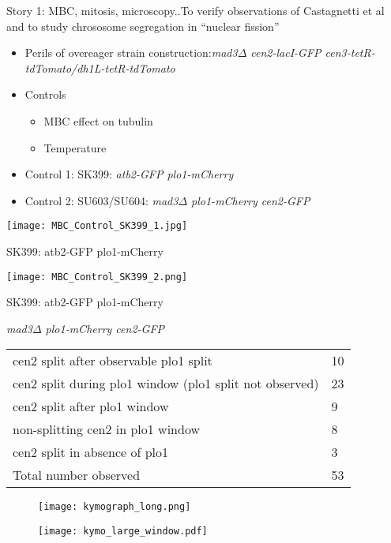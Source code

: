 \begin{frame}[allowframebreaks]{Story 1: MBC, mitosis, microscopy..}{To verify observations of Castagnetti et al and to study chrososome segregation in ``nuclear fission''}

\begin{itemize}
\item Perils of overeager strain construction:{\it mad3$\Delta$ cen2-lacI-GFP cen3-tetR-tdTomato/dh1L-tetR-tdTomato}
\item Controls
	\begin{itemize}
	\item MBC effect on tubulin
	\item Temperature
	\end{itemize}
\item Control 1: SK399: { \it atb2-GFP plo1-mCherry}
\item Control 2: SU603/SU604: {\it mad3$\Delta$ plo1-mCherry cen2-GFP}
\end{itemize}
\framebreak
\begin{center}
\texttt{[image: MBC\_Control\_SK399\_1.jpg]}

SK399: atb2-GFP plo1-mCherry
\end{center}
\framebreak

\begin{center}
\texttt{[image: MBC\_Control\_SK399\_2.png]}

SK399: atb2-GFP plo1-mCherry
\end{center}

\framebreak

\begin{center}
 {\it mad3$\Delta$ plo1-mCherry cen2-GFP}

\begin{tabular}{|l l|}
\hline
cen2 split after observable plo1 split & 10 \\
cen2 split during plo1 window (plo1 split not observed) & 23 \\
cen2 split after plo1 window & 9 \\
non-splitting cen2 in plo1 window & 8 \\
cen2 split in absence of plo1 & 3\\
\hline
Total number observed & 53 \\
\hline
\end{tabular}
\end{center}

\framebreak
\begin{figure}
\centering
\texttt{[image: kymograph\_long.png]}
\end{figure}

\begin{figure}
\texttt{[image: kymo\_large\_window.pdf]}
\end{figure}
\end{frame}
